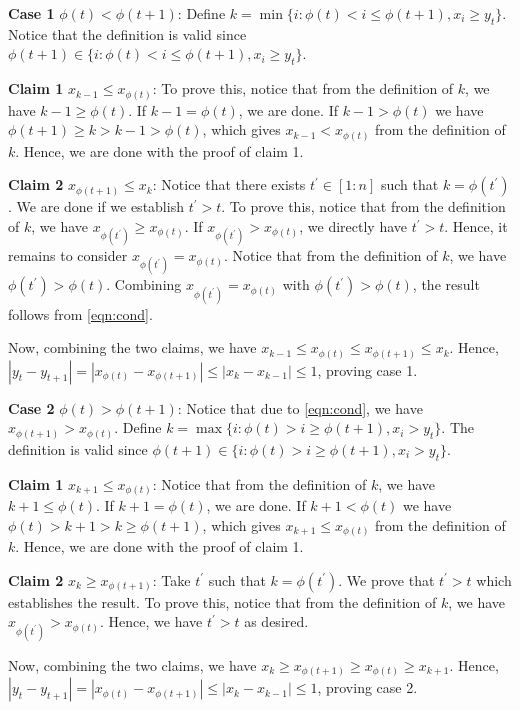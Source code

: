 \documentclass[12pt,draftcls, onecolumn]{IEEEtran}
\begin{document}
{\noindent
\textbf{Case 1} $\phi(t) < \phi(t+1)$: Define $k = \min\{i : \phi(t) < i \leq \phi(t+1), x_i \geq y_t\}$. Notice that the definition is valid since $ \phi(t+1) \in \{i : \phi(t) < i \leq \phi(t+1), x_i \geq y_t\}$. 

\textbf{Claim 1} $x_{k-1}  \leq  x_{\phi(t)}$:
To prove this, notice that from the definition of $k$, we have $k -1 \geq \phi(t)$. If $k-1 = \phi(t)$, we are done. If $k-1 > \phi(t)$ we have $\phi(t+1) \geq k> k-1 > \phi(t)$, which gives $x_{k-1} < x_{\phi(t)}$ from the definition of $k$. Hence, we are done with the proof of claim 1.

\textbf{Claim 2} $x_{\phi(t+1)}  \leq x_k$: Notice that there exists $t^{'} \in [1:n]$ such that $k = \phi(t^{'})$. We are done if we establish $t^{'} >t$. To prove this, notice that from the definition of $k$, we have $x_{\phi(t^{'})} \geq  x_{\phi(t)}$. If $x_{\phi(t^{'})} >  x_{\phi(t)}$, we directly have $t^{'} > t$. Hence, it remains to consider $x_{\phi(t^{'})} =  x_{\phi(t)}$. Notice that from the definition of $k$, we have $\phi(t^{'}) > \phi(t)$. Combining $x_{\phi(t^{'})} =  x_{\phi(t)}$ with $\phi(t^{'}) > \phi(t)$, the result follows from \eqref{eqn:cond}.

Now, combining the two claims, we have $x_{k-1}  \leq  x_{\phi(t)} \leq x_{\phi(t+1)}  \leq x_k$. Hence, $|y_t - y_{t+1}| = |x_{\phi(t)}-x_{\phi(t+1)}| \leq |x_k - x_{k-1}|\leq  1$, proving case 1.


\noindent
\textbf{Case 2}  $\phi(t) > \phi(t+1)$: Notice that due to \eqref{eqn:cond}, we have $x_{\phi(t+1)} > x_{\phi(t)}$. Define $k = \max\{i : \phi(t) > i \geq  \phi(t+1), x_i > y_{t}\}$. The definition is valid since $\phi(t+1) \in \{i : \phi(t) > i \geq  \phi(t+1), x_i > y_{t}\}$.

\textbf{Claim 1} $x_{k+1}  \leq  x_{\phi(t)}$:
Notice that from the definition of $k$, we have $k+1 \leq \phi(t)$. If $k+1 = \phi(t)$, we are done. If $k+1 < \phi(t)$ we have $\phi(t) > k+1> k \geq \phi(t+1)$, which gives $x_{k+1} \leq x_{\phi(t)}$ from the definition of $k$. Hence, we are done with the proof of claim 1.

\textbf{Claim 2} $x_k \geq x_{\phi(t+1)}$:  Take $t^{'}$ such that $k = \phi(t^{'})$. We prove that $t^{'} >t$ which establishes the result. To prove this, notice that from the definition of $k$, we have $x_{\phi(t^{'})} >  x_{\phi(t)}$. Hence, we have $t^{'} > t$ as desired.


Now, combining the two claims, we have $x_{k}  \geq  x_{\phi(t+1)} \geq x_{\phi(t)}  \geq x_{k+1}$. Hence, $|y_t - y_{t+1}| = |x_{\phi(t)}-x_{\phi(t+1)}| \leq |x_k - x_{k-1}|\leq  1$, proving case 2.

}
\end{document}

